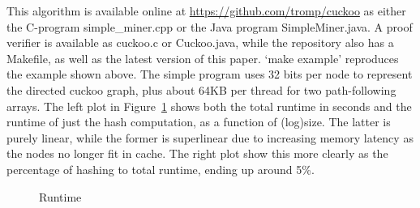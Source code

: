 \documentclass[11pt, oneside]{article}
\begin{document}
This algorithm is available online at \url{https://github.com/tromp/cuckoo}
as either the C-program simple\_miner.cpp or the Java program SimpleMiner.java.
A proof verifier is available as cuckoo.c or Cuckoo.java, while the repository
also has a Makefile, as well as the latest version of this paper.
`make example' reproduces the example shown above.
The simple program uses 32 bits per node to represent the directed cuckoo graph,
plus about 64KB per thread for two path-following arrays.
The left plot in Figure~\ref{runtimes} shows both the total runtime in seconds and the runtime of just
the hash computation, as a function of (log)size. The latter is purely
linear, while the former is superlinear due to increasing memory latency
as the nodes no longer fit in cache. The right plot show this more clearly
as the percentage of hashing to total runtime, ending up around 5\%.

\begin{figure}
\begin{center}
\end{center}
\caption{Runtime}
\label{runtimes}
\end{figure}
\end{document}
